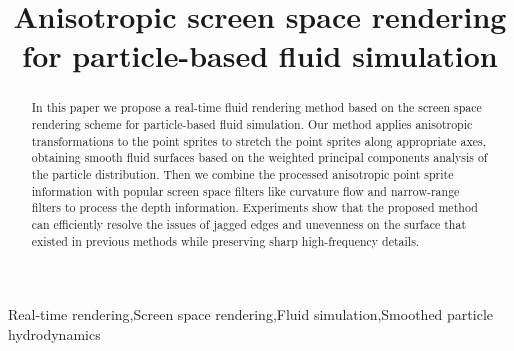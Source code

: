 \documentclass[times,twocolumn,final]{elsarticle}
\begin{document}

\begin{frontmatter}

\title{Anisotropic screen space rendering for particle-based fluid simulation
}%

\author{}
    


\received{\today}


\begin{abstract}
In this paper we propose a real-time fluid rendering method based on the screen space rendering scheme for particle-based fluid simulation. Our method applies anisotropic transformations to the point sprites to stretch the point sprites along appropriate axes, obtaining smooth fluid surfaces based on the weighted principal components analysis of the particle distribution. Then we combine the processed anisotropic point sprite information with popular screen space filters like curvature flow and narrow-range filters to process the depth information. Experiments show that the proposed method can efficiently resolve the issues of jagged edges and unevenness on the surface that existed in previous methods while preserving sharp high-frequency details.
\end{abstract}

\begin{keyword}
\KWD Real-time rendering\sep Screen space rendering\sep Fluid simulation\sep Smoothed particle hydrodynamics
\end{keyword}

\end{frontmatter}
\end{document}
